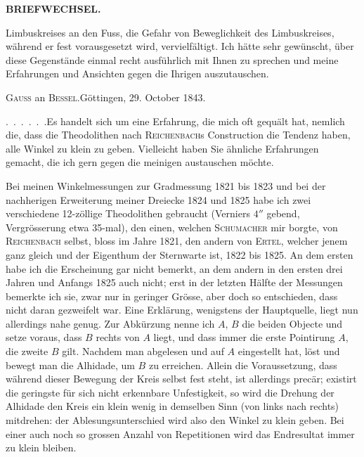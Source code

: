 \par\clearpage
\noindent{}\hfill{\small\textbf{BRIEFWECHSEL.}}\hfill\null\par\medskip
\noindent Limbuskreises an den Fuss, die Gefahr von Beweglichkeit des Limbuskreises, während er fest vorausgesetzt wird, vervielfältigt. Ich hätte sehr gewünscht, über diese Gegenstände einmal recht ausführlich mit Ihnen zu sprechen und meine Erfahrungen und Ansichten gegen die Ihrigen auszutauschen.
\par\bigskip
\begin{center}{\large\textsc{Gauss} an \textsc{Bessel}.\quad Göttingen, 29. October 1843.}\end{center}
\par\noindent\hspace*{\parindent}.\ .\ .\ .\ .\ .\enspace Es handelt sich um eine Erfahrung, die mich oft gequält hat, nemlich die, dass die Theodolithen nach \textsc{Reichenbach}s Construction die Tendenz haben, alle Winkel zu klein zu geben. Vielleicht haben Sie ähnliche Erfahrungen gemacht, die ich gern gegen die meinigen austauschen möchte.

\par\noindent\hspace*{\parindent}Bei meinen Winkelmessungen zur Gradmessung 1821 bis 1823 und bei der nachherigen Erweiterung meiner Dreiecke 1824 und 1825 habe ich zwei verschiedene 12-zöllige Theodolithen gebraucht (Verniers $4''$ gebend, Vergrösserung etwa 35-mal), den einen, welchen \textsc{Schumacher} mir borgte, von \textsc{Reichenbach} selbst, bloss im Jahre 1821, den andern von \textsc{Ertel}, welcher jenem ganz gleich und der Eigenthum der Sternwarte ist, 1822 bis 1825. An dem ersten habe ich die Erscheinung gar nicht bemerkt, an dem andern in den ersten drei Jahren und Anfangs 1825 auch nicht; erst in der letzten Hälfte der Messungen bemerkte ich sie, zwar nur in geringer Grösse, aber doch so entschieden, dass nicht daran gezweifelt war. Eine Erklärung, wenigstens der Hauptquelle, liegt nun allerdings nahe genug. Zur Abkürzung nenne ich $A$, $B$ die beiden Objecte und setze voraus, dass $B$ rechts von $A$ liegt, und dass immer die erste Pointirung $A$, die zweite $B$ gilt. Nachdem man abgelesen und auf $A$ eingestellt hat, löst und bewegt man die Alhidade, um $B$ zu erreichen. Allein die Voraussetzung, dass während dieser Bewegung der Kreis selbst  fest steht, ist allerdings precär; existirt die geringste für sich nicht erkennbare Unfestigkeit, so wird die Drehung der Alhidade den Kreis ein klein wenig in demselben Sinn (von links nach rechts) mitdrehen: der Ablesungsunterschied wird also den Winkel zu klein geben. Bei einer auch noch so grossen Anzahl von Repetitionen wird das Endresultat immer zu klein bleiben.

